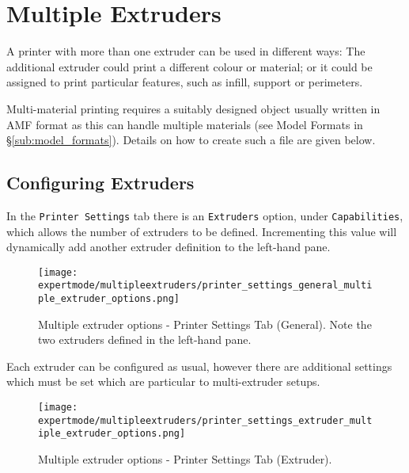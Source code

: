 
\section{Multiple Extruders} %
\label{sec:multiple_extruders}

A printer with more than one extruder can be used in different ways: The additional extruder could print a different colour or material; or it could be assigned to print particular features, such as infill, support or perimeters.

Multi-material printing requires a suitably designed object usually written in AMF format as this can handle multiple materials (see Model Formats in §\ref{sub:model_formats}).  Details on how to create such a file are given below.


\subsection{Configuring Extruders} %
\label{sub:configuring_extruders}

In the \texttt{Printer Settings} tab there is an \texttt{Extruders} option, under \texttt{Capabilities}, which allows the number of extruders to be defined.  Incrementing this value will dynamically add another extruder definition to the left-hand pane.

\begin{figure}[H]
\centering
\texttt{[image: expertmode/multipleextruders/printer\_settings\_general\_multiple\_extruder\_options.png]}
\caption{Multiple extruder options - Printer Settings Tab (General).  Note the two extruders defined in the left-hand pane.}
\label{fig:printer_settings_general_multiple_extruder_options}
\end{figure}

Each extruder can be configured as usual, however there are additional settings which must be set which are particular to multi-extruder setups.

\begin{figure}[H]
\centering
\texttt{[image: expertmode/multipleextruders/printer\_settings\_extruder\_multiple\_extruder\_options.png]}
\caption{Multiple extruder options - Printer Settings Tab (Extruder).}
\label{fig:printer_settings_extruder_multiple_extruder_options}
\end{figure}

